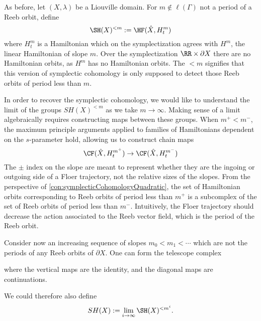 

    As before, let $(X, \lambda)$ be a Liouville domain. For $m\not\in \ell(\Gamma)$ not a period of a Reeb orbit, define 
    \[\SH(X)^{< m}:=\HF(\hat X, H^m_t)\]
    where $H^m_t$ is a Hamiltonian which on the symplectization agrees with $H^m$, the linear Hamiltonian of slope $m$. 
    Over the symplectization $\RR\times \partial X$ there are no Hamiltonian orbits, as $H^m$ has no Hamiltonian orbits. The $< m$ signifies that this version of symplectic cohomology is only supposed to detect those Reeb orbits of period less than $m$.

    In order to recover the symplectic cohomology, we would like to understand the limit of the groups $SH(X)^{< m}$ as we take $m\to\infty$. Making sense of a limit algebraically requires constructing maps between these groups. When $m^+< m^-$, the maximum principle arguments applied to families of Hamiltonians dependent on the $s$-parameter hold, allowing us to construct chain maps 
    \[\CF(\hat X, H^{m^+}_t)\to \CF(\hat X, H^{m^-}_t)\]
    The $\pm$ index on the slope are meant to represent whether they are the ingoing or outgoing side of a Floer trajectory, not the relative sizes of the slopes. From the perspective of \cref{con:symplecticCohomologyQuadratic}, the set of Hamiltonian orbits corresponding to Reeb orbits of period less than $m^+$ is a subcomplex of the set of Reeb orbits of period less than $m^-$. Intuitively, the Floer trajectory should decrease the action associated to the Reeb vector field, which is the period of the Reeb orbit.
    

    Consider now an increasing sequence of slopes $m_0< m_1< \cdots $ which are not the periods of any Reeb orbits of $\partial X$. One can form the telescope complex
    
    where the vertical maps are the identity, and the diagonal maps are continuations.
    
    We could therefore also define
    \[SH(X):=\lim_{i\to\infty} \SH(X)^{< m^i}.\]
